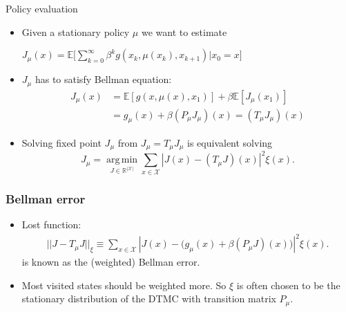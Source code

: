 \documentclass{beamer}
\def\R{{\mathbb R}}
\def\X{{\mathcal X}}
\def\E{{\mathbb E}}
\DeclareMathOperator*{\argmin}{arg\,min}
\begin{document}
\begin{frame}{Policy evaluation}
\begin{itemize}
\item Given a stationary policy $\mu$ we want to estimate
\begin{center}
$J_\mu(x) = \E\Big[\sum\limits_{k=0}^\infty \beta^k g(x_k, \mu(x_k), x_{k+1})| x_0 = x \Big]$
\end{center}
\item $J_\mu$ has to satisfy Bellman equation:
  \begin{align*}
    J_{\mu}(x) & = \E[g(x, \mu(x), x_1)] + \beta \E[J_{\mu}(x_1)] \\
              & = g_\mu(x) + \beta(P_\mu J_\mu)(x) = (T_{\mu} J_{\mu})(x)
  \end{align*}



\item Solving fixed point $J_\mu$ from $J_\mu = T_\mu J_\mu$ is
  equivalent solving
  $$J_\mu =\argmin\limits_{J\in \R^{|\X|}} \sum_{x\in \mathcal{X}}|J(x) - (T_\mu J)(x)|^2 \xi(x).$$




    \end{itemize}


\end{frame}

\begin{frame}
  \frametitle{Bellman error}
  \begin{itemize}
  \item  Lost function:
  \begin{align}\label{eq:bellmanloss}
   || J-T_\mu J||_\xi \equiv   \sum_{x\in \mathcal{X}}|J(x) - \big(g_\mu(x)+ \beta (P_\mu J)(x)\big)|^2 \xi(x).
  \end{align}
  is known as the (weighted) Bellman error.
\item Most visited states should be weighted more. So $\xi$ is often
  chosen to be the stationary distribution of the DTMC with transition matrix $P_\mu$.


    \end{itemize}
\end{frame}
\end{document}
